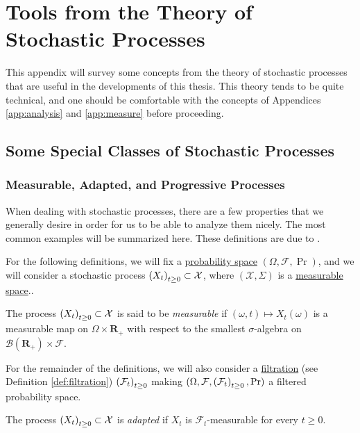 \chapter{Tools from the Theory of Stochastic Processes}\label{app:stochastic}
This appendix will survey some concepts from the theory of stochastic processes
that are useful in the developments of this thesis. This theory tends to be
quite technical, and one should be comfortable with the concepts of Appendices
\ref{app:analysis} and \ref{app:measure} before proceeding.

\section{Some Special Classes of Stochastic Processes}
\subsection{Measurable, Adapted, and Progressive Processes}\label{app:adapted}
When dealing with stochastic processes, there are a few properties that we
generally desire in order for us to be able to analyze them nicely. The most
common examples will be summarized here. These definitions are due to
\citet{le2016brownian}.

For the following definitions, we will fix a
\hyperref[def:probability-space]{probability space} $(\Omega, \mathcal{F},
\Pr)$, and we will consider a stochastic process
$\indexedabove{t}{X}\subset\mathcal{X}$, where $(\mathcal{X}, \Sigma)$ is a
\hyperref[def:measurable-space]{measurable space}..

\begin{definition}\label{def:process:measurable}
  The process
  $\indexedabove{t}{X}\subset \mathcal{X}$
  is said to be
  \emph{measurable} if $(\omega, t)\mapsto X_t(\omega)$ is a measurable map on
  $\Omega\times\mathbf{R}_+$ with respect to the smallest $\sigma$-algebra on
  $\mathscr{B}(\mathbf{R}_+)\times\mathcal{F}$.
\end{definition}

For the remainder of the definitions, we will also consider a
\hyperref[def:filtration]{filtration} (see Definition \ref{def:filtration})
$\indexedabove{t}{\mathcal{F}}$ making $(\Omega, \mathcal{F},
\indexedabove{t}{\mathcal{F}},\Pr)$ a filtered probability space.

\begin{definition}\label{def:process:adapted}
  The process $\indexedabove{t}{X}\subset\mathcal{X}$ is \emph{adapted} if $X_t$
  is $\mathcal{F}_t$-measurable for every $t\geq 0$.
\end{definition}

